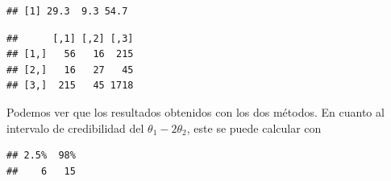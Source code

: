 \begin{Eje}
\begin{knitrout}
\begin{kframe}
\begin{alltt}
  \hlopt{:}
   \hlkwb{<-} \hlopt{+}
   \hlkwb{<-} \hlstd{(}\hlopt{/}\hlopt{+}
\hlstd{\}}
 \hlkwb{<-} 
 \hlkwb{<-} \hlstd{(}\hlstd{(}\hlstd{(Sigma.pos[,}\hlstd{,}\hlstd{]),}\hlstd{(Sigma.pos[,}\hlstd{,}\hlstd{]),}
                        \hlstd{(Sigma.pos[,}\hlstd{,}\hlstd{]),} \hlstd{(Sigma.pos[,}\hlstd{,}\hlstd{]),}\hlstd{(Sigma.pos[,}\hlstd{,}\hlstd{]),}
                        \hlstd{(Sigma.pos[,}\hlstd{,}\hlstd{]),}\hlstd{(Sigma.pos[,}\hlstd{,}\hlstd{]),}\hlstd{(Sigma.pos[,}\hlstd{,}\hlstd{]),}
                        \hlstd{(Sigma.pos[,}\hlstd{,}\hlstd{])),}\hlstd{,}\hlstd{)}
\end{alltt}
\begin{verbatim}
## [1] 29.3  9.3 54.7
\end{verbatim}
\begin{alltt}
\end{alltt}
\begin{verbatim}
##      [,1] [,2] [,3]
## [1,]   56   16  215
## [2,]   16   27   45
## [3,]  215   45 1718
\end{verbatim}
\end{kframe}
\end{knitrout}
Podemos ver que los resultados obtenidos con los dos métodos. En cuanto al intervalo de credibilidad del $\theta_1-2\theta_2$, este se puede calcular con
\begin{knitrout}
\color{fgcolor}\begin{kframe}
\begin{alltt}
\hlstd{(theta.pos[,}\hlstd{]}\hlopt{-}\hlopt{*}\hlstd{theta.pos[,}\hlstd{],} \hlstd{(}\hlstd{,} \hlstd{))}
\end{alltt}
\begin{verbatim}
## 2.5%  98% 
##    6   15
\end{verbatim}

\end{kframe}
\end{knitrout}
\end{Eje}
